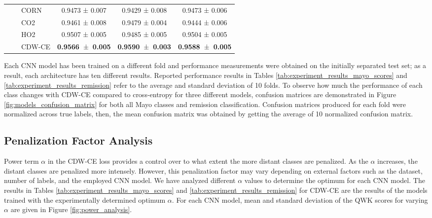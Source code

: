 \documentclass[runningheads]{llncs}
\begin{document}
\begin{table}[t!]
\begin{adjustbox}{center}
\begin{tabular}{cllccc}
                          &  & CORN                   & 0.9473 ± 0.007                   & 0.9429 ± 0.008                   & 0.9473 ± 0.006                    \\
                          &  & CO2                    & 0.9461 ± 0.008                   & 0.9479 ± 0.004                   & 0.9444 ± 0.006                    \\
                          &  & HO2                    & 0.9507 ± 0.005                   & 0.9485 ± 0.005                   & 0.9504 ± 0.005                    \\
                          &  & CDW-CE                 & \textbf{0.9566~}±\textbf{~0.005} & \textbf{0.9590~}±\textbf{~0.003} & \textbf{0.9588~}±\textbf{~0.005}  \\
\hline
\end{tabular}
\end{adjustbox}
\end{table}

Each CNN model has been trained on a different fold and performance measurements were obtained on the initially separated test set; as a result, each architecture has ten different results. Reported performance results in Tables \ref{tab:experiment_results_mayo_scores} and \ref{tab:experiment_results_remission} refer to the average and standard deviation of 10 folds. To observe how much the performance of each class changes  with CDW-CE compared to cross-entropy for three different models, confusion matrices are demonstrated in Figure \ref{fig:models_confusion_matrix} for both all Mayo classes and remission classification. Confusion matrices produced for each fold were normalized across true labels, then, the mean confusion matrix was obtained by getting the average of 10 normalized confusion matrix.

\subsection{Penalization Factor Analysis}

Power term $\alpha$ in the CDW-CE loss provides a control over to what extent the more distant classes are penalized. As the $\alpha$ increases, the distant classes are penalized more intensely. However, this penalization factor may vary depending on external factors such as the dataset, number of labels, and the employed CNN model. We have analyzed different $\alpha$ values to determine the optimum for each CNN model. The results in Tables \ref{tab:experiment_results_mayo_scores} and \ref{tab:experiment_results_remission} for CDW-CE are the results of the models trained with the experimentally determined optimum $\alpha$. For each CNN model, mean and standard deviation of the QWK scores for varying $\alpha$ are given in Figure \ref{fig:power_analysis}.
\end{document}
